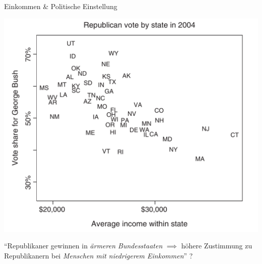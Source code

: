\documentclass[
  10pt,
  ignorenonframetext,
]{beamer}
\begin{document}
\begin{frame}{Einkommen \& Politische Einstellung}
\label{einkommen-politische-einstellung}
\begin{center}
\includegraphics[height=.7\textheight]{pics/5-presidential2004-state.png}
\end{center}

``Republikaner gewinnen in \emph{ärmeren Bundesstaaten} \(\implies\)
höhere Zustimmung zu Republikanern bei \emph{Menschen mit niedrigerem
Einkommen}'' ?
\end{frame}
\end{document}
